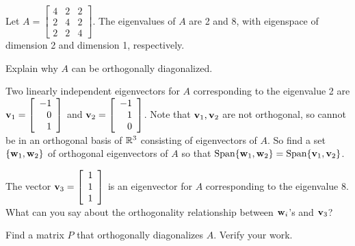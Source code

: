 	
	
	
	
	
	


\begin{activity} \label{act:7_a_3} Let $A = \left[ \begin{array}{ccc} 4&2&2 \\ 2&4&2 \\ 2&2&4 \end{array} \right]$. The eigenvalues of $A$ are 2 and 8, with eigenspace of dimension 2 and dimension 1, respectively.
\ba
\item Explain why $A$ can be orthogonally diagonalized.

	
\item Two linearly independent eigenvectors for $A$ corresponding to the eigenvalue 2 are $\mathbf{v}_1 = \left[ \begin{array}{r} -1 \\ 0 \\ 1 \end{array} \right]$ and $\mathbf{v}_2 = \left[ \begin{array}{r} -1 \\ 1 \\ 0 \end{array} \right]$. Note that $\mathbf{v}_1, \mathbf{v}_2$ are not orthogonal, so cannot be in an orthogonal basis of $\mathbb{R}^3$ consisting of eigenvectors of $A$. So find a set $\{\mathbf{w}_1, \mathbf{w}_2\}$ of orthogonal eigenvectors of $A$ so that $\text{Span}\{\mathbf{w}_1, \mathbf{w}_2\} = \text{Span}\{\mathbf{v}_1, \mathbf{v}_2\}$.

	
\item The vector $\mathbf{v}_3=\left[ \begin{array}{c} 1 \\ 1 \\ 1 \end{array} \right]$ is an eigenvector for $A$ corresponding to the eigenvalue 8. What can you say about the orthogonality relationship between $\mathbf{w}_i$'s and $\mathbf{v}_3$? 


\item Find a matrix $P$ that orthogonally diagonalizes $A$. Verify your work.	
	
\ea
\end{activity}


